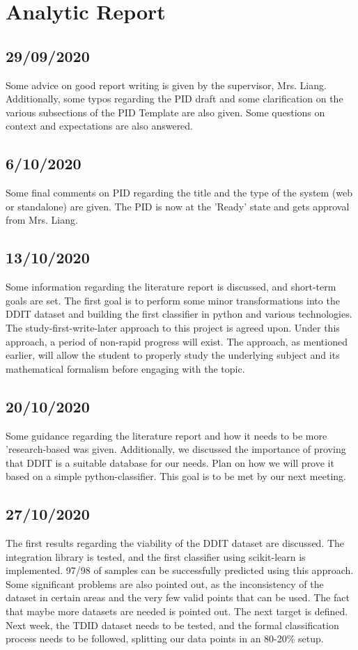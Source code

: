 \documentclass[a4paper,11pt,oneside]{book}
\begin{document}
	\section{Analytic Report}
	\subsection{29/09/2020}
	Some advice on good report writing is given by the supervisor, Mrs. Liang. 
	Additionally, some typos regarding the PID draft and some clarification on the various subsections of the PID Template are also given. 
	Some questions on context and expectations are also answered.
	\subsection{6/10/2020}
	Some final comments on PID regarding the title and the type of the system (web or standalone) are given. 
	The PID is now at the 'Ready' state and gets approval from Mrs. Liang.
	\subsection{13/10/2020}
	Some information regarding the literature report is discussed, and short-term goals are set. The first goal is to
	perform some minor transformations into the DDIT dataset and building the first classifier in python 
	and various technologies. The study-first-write-later approach to this project is agreed upon. 
	Under this approach, a period of non-rapid progress will exist. The approach, as mentioned earlier, 
	will allow the student to properly study the underlying subject and its mathematical formalism before engaging with the topic.
	\subsection{20/10/2020}
	Some guidance regarding the literature report and how it needs to be more 'research-based was given. Additionally, we discussed 
	the importance of proving that DDIT is a suitable database for our needs. Plan on how we will prove it based on a simple 
	python-classifier. This goal is to be met by our next meeting.
	\subsection{27/10/2020}
	The first results regarding the viability of the DDIT dataset are discussed. The integration library is tested, 
	and the first classifier using scikit-learn is implemented. 97/98 of samples can be successfully predicted using this approach. 
	Some significant problems are also pointed out, as the inconsistency of the dataset in certain areas and the very few valid points
	that can be used. The fact that maybe more datasets are needed is pointed out. The next target is defined. Next week, 
	the TDID dataset needs to be tested, and the formal classification process needs to be followed, splitting our data points in an 
	80-20\% setup.
\end{document}
